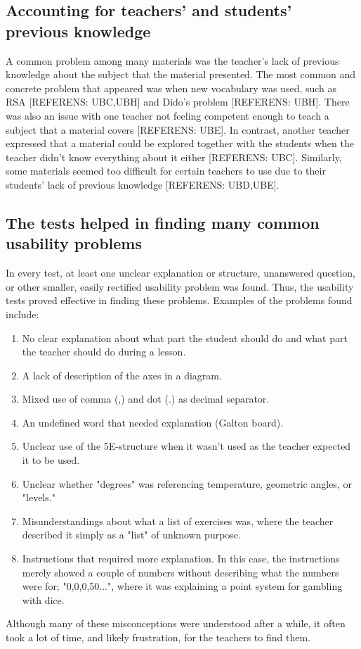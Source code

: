 \subsection{Accounting for teachers' and students' previous knowledge}
A common problem among many materials was the teacher's lack of previous knowledge about the subject that the material presented. The most common and concrete problem that appeared was when new vocabulary was used, such as RSA [REFERENS: UBC,UBH] and Dido's problem [REFERENS: UBH]. There was also an issue with one teacher not feeling competent enough to teach a subject that a material covers [REFERENS: UBE]. In contrast, another teacher expressed that a material could be explored together with the students when the teacher didn't know everything about it either [REFERENS: UBC]. Similarly, some materials seemed too difficult for certain teachers to use due to their students' lack of previous knowledge [REFERENS: UBD,UBE].

\subsection{The tests helped in finding many common usability problems}
In every test, at least one unclear explanation or structure, unanswered question, or other smaller, easily rectified usability problem was found. Thus, the usability tests proved effective in finding these problems. Examples of the problems found include:
\begin{enumerate}
	\item No clear explanation about what part the student should do and what part the teacher should do during a lesson.
	\item A lack of description of the axes in a diagram.
	\item Mixed use of comma (,) and dot (.) as decimal separator.
	\item An undefined word that needed explanation (Galton board).
	\item Unclear use of the 5E-structure when it wasn't used as the teacher expected it to be used.
	\item Unclear whether "degrees" was referencing temperature, geometric angles, or "levels."
	\item Misunderstandings about what a list of exercises was, where the teacher described it simply as a "list" of unknown purpose.
	\item Instructions that required more explanation. In this case, the instructions merely showed a couple of numbers without describing what the numbers were for; "0,0,0,50...", where it was explaining a point system for gambling with dice.
\end{enumerate}

Although many of these misconceptions were understood after a while, it often took a lot of time, and likely frustration, for the teachers to find them.
